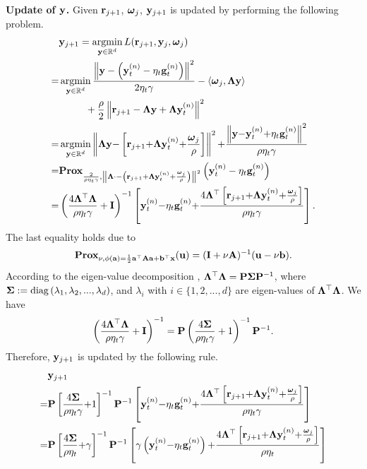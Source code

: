 \documentclass[journal]{IEEEtran}
\begin{document}
\textbf{Update of ${\bf y}$.} Given ${\bf r}_{j+1}$, $\boldsymbol{\omega}_j$, ${\bf y}_{j+1}$ is updated by performing the following problem.
\begin{align}
\nonumber
&\y_{j+1} = \argmin_{\y\in\RR^d} L(\r_{j+1}, \y_j, \bomega_j) \\ \nonumber
= & \argmin_{\y\in\RR^d} \frac{\lrnorm{\y - \lrincir{\y_t^{(n)} - \eta_t\g_t^{(n)}}}^2}{2\eta_t\gamma} - \lrangle{\bomega_j, \bLambda \y} \\ \nonumber 
& {~~~~~~~~} + \frac{\rho}{2}\lrnorm{\r_{j+1} - \bLambda \y + \bLambda\y_t^{(n)}}^2 \\ \nonumber
= & \argmin_{\y\in\RR^d} \small \lrnorm{\bLambda \y \mathrm{-} \left[\r_{j+1} \mathrm{+} \bLambda\y_t^{(n)} \mathrm{+} \frac{\bomega_j}{\rho}\right]}^2 \mathrm{+} \frac{\lrnorm{\y \mathrm{-} \y_t^{(n)} \mathrm{+} \eta_t\g_t^{(n)}}^2}{\rho\eta_t\gamma} \\ \nonumber
 = & \Prox_{\frac{2}{\rho\eta_t\gamma}, \lrnorm{\bLambda \cdot - \lrincir{\r_{j+1} + \bLambda\y_t^{(n)} + \frac{\bomega_j}{\rho}}}^2} \lrincir{\y_t^{(n)} - \eta_t\g_t^{(n)}} \\ \nonumber
= & \small \lrincir{\frac{4\bLambda^\top\bLambda}{\rho\eta_t\gamma} + \I}^{-1}\left[\y_t^{(n)} \mathrm{-} \eta_t\g_t^{(n)}\mathrm{+}\frac{4\bLambda^\top\left[\r_{j+1} \mathrm{+} \bLambda\y_t^{(n)} \mathrm{+} \frac{\bomega_j}{\rho}\right]}{\rho\eta_t\gamma}\right].
\end{align} The last equality holds due to 
\begin{align}
\nonumber
\textbf{Prox}_{\nu, \phi({\bf a}) = \frac{1}{2}{\bf a}^\top{\bf A}{\bf a}+{\bf b}^\top{\bf x}}({\bf u}) = ({\bf I} + \nu{\bf A})^{-1}({\bf u}-\nu{\bf b}).
\end{align} According to the eigen-value decomposition \cite{xx}, $\mathbf{\Lambda}^\top\mathbf{\Lambda} = {\bf P}\boldsymbol{\Sigma}{\bf P}^{-1}$, where $\boldsymbol{\Sigma} := {\rm diag}\left( \lambda_1, \lambda_2, ..., \lambda_d \right)$, and $\lambda_i$ with $i\in\{1,2, ..., d\}$ are eigen-values of $\mathbf{\Lambda}^\top\mathbf{\Lambda}$. We have 
\begin{align}
\nonumber
\left( \frac{4\mathbf{\Lambda}^\top\mathbf{\Lambda}}{\rho\eta_t\gamma} + {\bf I} \right)^{-1} = {\bf P}\left( \frac{4\boldsymbol{\Sigma}}{\rho\eta_t\gamma} + 1 \right)^{-1}{\bf P}^{-1}.
\end{align} Therefore, ${\bf y}_{j+1}$ is updated by the following rule.
\begin{align}
\nonumber
&\y_{j+1}  \\ \nonumber
= & \small \P\left[\frac{4\bSigma}{\rho\eta_t\gamma} \mathrm{+} 1\right]^{\mathrm{-1}}\P^{\mathrm{-1}}\left[\y_t^{(n)} \mathrm{-} \eta_t\g_t^{(n)}\mathrm{+}\frac{4\bLambda^\top\left[\r_{j+1} \mathrm{+} \bLambda\y_t^{(n)} \mathrm{+} \frac{\bomega_j}{\rho}\right]}{\rho\eta_t\gamma}\right] \\ \nonumber
= & \small \P\left[\frac{4\bSigma}{\rho\eta_t} \mathrm{+} \gamma\right]^{\mathrm{-1}}\P^{\mathrm{-1}}\left[\gamma\lrincir{\y_t^{(n)} \mathrm{-} \eta_t\g_t^{(n)}}\mathrm{+}\frac{4\bLambda^\top\left[\r_{j+1} \mathrm{+} \bLambda\y_t^{(n)} \mathrm{+} \frac{\bomega_j}{\rho}\right]}{\rho\eta_t}\right] \\ \nonumber
\end{align} 
\end{document}
